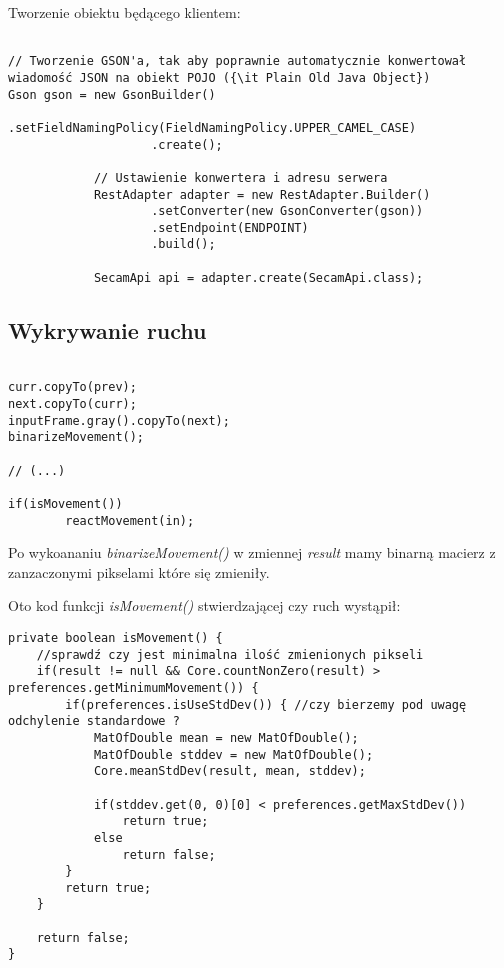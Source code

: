 Tworzenie obiektu będącego klientem:

\begin{lstlisting}

// Tworzenie GSON'a, tak aby poprawnie automatycznie konwertował wiadomość JSON na obiekt POJO ({\it Plain Old Java Object})
Gson gson = new GsonBuilder()
                    .setFieldNamingPolicy(FieldNamingPolicy.UPPER_CAMEL_CASE)
                    .create();
			
			// Ustawienie konwertera i adresu serwera
            RestAdapter adapter = new RestAdapter.Builder()
                    .setConverter(new GsonConverter(gson))
                    .setEndpoint(ENDPOINT)
                    .build();

            SecamApi api = adapter.create(SecamApi.class);

\end{lstlisting}

\subsection{Wykrywanie ruchu}

\begin{lstlisting}

curr.copyTo(prev);
next.copyTo(curr);
inputFrame.gray().copyTo(next);
binarizeMovement();
			
// (...)
			
if(isMovement())
		reactMovement(in);

\end{lstlisting}

Po wykoananiu {\it binarizeMovement()} w zmiennej {\it result} mamy binarną macierz z zanzaczonymi pikselami które się zmieniły. 

Oto kod funkcji {\it isMovement()} stwierdzającej czy ruch wystąpił:

\begin{lstlisting}
private boolean isMovement() {
	//sprawdź czy jest minimalna ilość zmienionych pikseli
	if(result != null && Core.countNonZero(result) > preferences.getMinimumMovement()) {
		if(preferences.isUseStdDev()) { //czy bierzemy pod uwagę odchylenie standardowe ?
			MatOfDouble mean = new MatOfDouble();
			MatOfDouble stddev = new MatOfDouble();
			Core.meanStdDev(result, mean, stddev);
			
			if(stddev.get(0, 0)[0] < preferences.getMaxStdDev()) 
				return true;
			else
				return false;
		}
		return true;	
	}
	
	return false;
}

\end{lstlisting}
			
